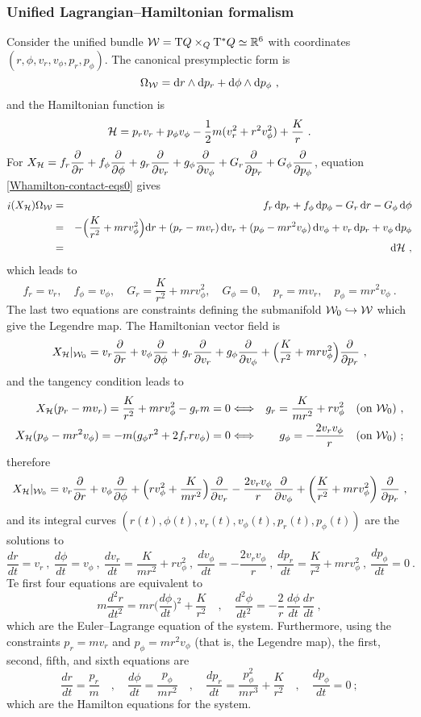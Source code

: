 \documentclass[12pt]{report}
\def\beann{\begin{eqnarray*}}
\def\eeann{\end{eqnarray*}}
\def\dst{\displaystyle}
\def\derpar#1#2{\frac{\partial{#1}}{\partial{#2}}}
\def\d{{\rm d}}
\def\Real{\mathbb{R}}
\def\Tan{{\rm T}}
\def\inn{\mathop{i}\nolimits}
\begin{document}
\subsubsection{Unified Lagrangian--Hamiltonian formalism}


Consider the unified bundle ${\cal W}=\Tan Q\times_Q\Tan^*Q\simeq\Real^6$
with coordinates $(r,\phi,v_r,v_\phi,p_r,p_\phi)$. 
The canonical presymplectic form is
$$
\Omega_{\cal W}=\d r \wedge\d p_r+\d\phi \wedge\d p_\phi \ ,
$$
and the Hamiltonian function is
$$
{\cal H}=p_rv_r+p_\phi v_\phi-\frac{1}{2}m(v_r^2+r^2v_\phi^2)+\frac{K}{r} \ .
$$
For $\displaystyle X_{\cal H}=f_r\derpar{}{r}+
f_\phi\derpar{}{\phi}+g_r\derpar{}{v_r}+g_\phi\derpar{}{v_\phi}+G_r\derpar{}{p_r}+G_\phi\derpar{}{p_\phi}$,
equation \eqref{Whamilton-contact-eqs0} gives
\beann
\inn(X_{\cal H})\Omega_{\cal W}&=&
 f_r\, \d p_r+f_\phi\, \d p_\phi-G_r\, \d r-G_\phi\, \d\phi
\\ &=&
-\Big(\frac{K}{r^2}+mrv_\phi^2\Big)\d r+(p_r-mv_r)\,\d v_r+(p_\phi-mr^2v_\phi)\,\d v_\phi+v_r\, \d p_r+v_\phi\, \d p_\phi
\\ &=& \d{\cal H}\ ,
\eeann
which leads to
$$
f_r=v_r  , \quad f_\phi=v_\phi , \quad
G_r=\frac{K}{r^2}+mrv_\phi^2  , \quad G_\phi=0 , \quad
p_r=mv_r  , \quad p_\phi=mr^2v_\phi \ .
$$
The last two equations are constraints defining the submanifold
${\cal W}_0\hookrightarrow{\cal W}$ which give the Legendre map.
The Hamiltonian vector field is
$$
X_{\cal H}\vert_{{\cal W}_0}=
v_r\derpar{}{r}+v_\phi\derpar{}{\phi}+g_r\derpar{}{v_r}+g_\phi\derpar{}{v_\phi}
+\Big(\frac{K}{r^2}+mrv_\phi^2\Big)\derpar{}{p_r} \ ,
$$
and the tangency condition leads to
\beann
X_{\cal H}(p_r-mv_r)=\frac{K}{r^2}+mrv_\phi^2-g_rm=0 &\Longleftrightarrow&
g_r=\frac{K}{mr^2}+rv_\phi^2 \quad \mbox{\rm (on ${\cal W}_0$)} \ , \\
X_{\cal H}(p_\phi-mr^2v_\phi)=-m(g_\phi r^2+2f_rrv_\phi)=0 &\Longleftrightarrow&
g_\phi=-\frac{2v_rv_\phi}{r} \quad \mbox{\rm (on ${\cal W}_0$)} \ ;
\eeann
therefore
$$
X_{\cal H}\vert_{{\cal W}_0}=
v_r\derpar{}{r}+v_\phi\derpar{}{\phi}+
\Big(rv_\phi^2+\dst\frac{K}{mr^2}\Big)\derpar{}{v_r}-\frac{2v_rv_\phi}{r}\derpar{}{v_\phi}
+\left(\frac{K}{r^2}+mrv_\phi^2\right)\derpar{}{p_r} \ ,
$$
and its integral curves $(r(t),\phi(t),v_r(t),v_\phi(t),p_r(t),p_\phi(t))$ are the solutions to
$$
\frac{dr}{dt}=v_r \ , \
\frac{d\phi}{dt}=v_\phi \ , \
\frac{dv_r}{dt}=\frac{K}{mr^2}+rv_\phi^2 \ , \
\frac{dv_\phi}{dt}=-\frac{2v_rv_\phi}{r} \ , \
\frac{dp_r}{dt}=\frac{K}{r^2}+mrv_\phi^2 \ , \
\frac{dp_\phi}{dt}=0 \ .
$$
Te first four equations are equivalent to
$$
m\frac{d^2r}{dt^2}=mr\Big(\frac{d\phi}{dt}\Big)^2+\frac{K}{r^2}  \quad , \quad
 \frac{d^2\phi}{dt^2}=
-\frac{2}{r}\,\frac{d\phi}{dt}\,\frac{dr}{dt}\ ,
$$
which are the Euler--Lagrange equation of the system. 
Furthermore, using the constraints $p_r=mv_r$ 
and $p_\phi=mr^2v_\phi$ (that is, the Legendre map),
the first, second, fifth, and sixth equations are
$$
\frac{dr}{dt}=\frac{p_r}{m} \quad , \quad
\frac{d\phi}{dt}=\frac{p_\phi}{mr^2} \quad , \quad
\frac{dp_r}{dt}=\frac{p_\phi^2}{mr^3}+\frac{K}{r^2}  \quad , \quad
\frac{dp_\phi}{dt}=0 \ ;
$$
which are the Hamilton equations for the system.
\end{document}
